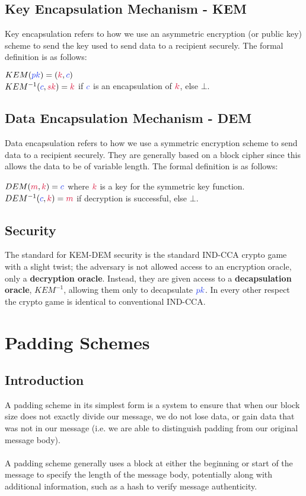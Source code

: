 	\subsection{Key Encapsulation Mechanism - KEM}
		Key encapsulation refers to how we use an asymmetric encryption (or public key) scheme to send the key used to send data to a recipient securely. The formal definition is as follows:
		\begin{center}
			$KEM(\cpk) = (\cK,\cc)$\\
			$KEM^{-1}(\cc, \csk) = \cK$ \quad if $\cc$ is an encapsulation of $\cK$, else $\bot$.
		\end{center}

	\subsection{Data Encapsulation Mechanism - DEM}
		Data encapsulation refers to how we use a symmetric encryption scheme to send data to a recipient securely. They are generally based on a block cipher since this allows the data to be of variable length. The formal definition is as follows:
		\begin{center}
			$DEM(\cm,\cK) = \cc$ \quad where $\cK$ is a key for the symmetric key function.\\
			$DEM^{-1}(\cc,\ck) = \cm $ \quad if decryption is successful, else $\bot$.
		\end{center}

	\subsection{Security}

		The standard for KEM-DEM security is the standard IND-CCA crypto game with a slight twist; the adversary is not allowed access to an encryption oracle, only a \textbf{decryption oracle}. Instead, they are given access to a \textbf{decapsulation oracle}, $KEM^{-1}$, allowing them only to decapsulate $\cpk$. In every other respect the crypto game is identical to conventional IND-CCA.

\section{Padding Schemes}

	\subsection{Introduction}
		A padding scheme in its simplest form is a system to ensure that when our block size does not exactly divide our message, we do not lose data, or gain data that was not in our message (i.e. we are able to distinguish padding from our original message body).\\
		\\
		A padding scheme generally uses a block at either the beginning or start of the message to specify the length of the message body, potentially along with additional information, such as a hash to verify message authenticity.

